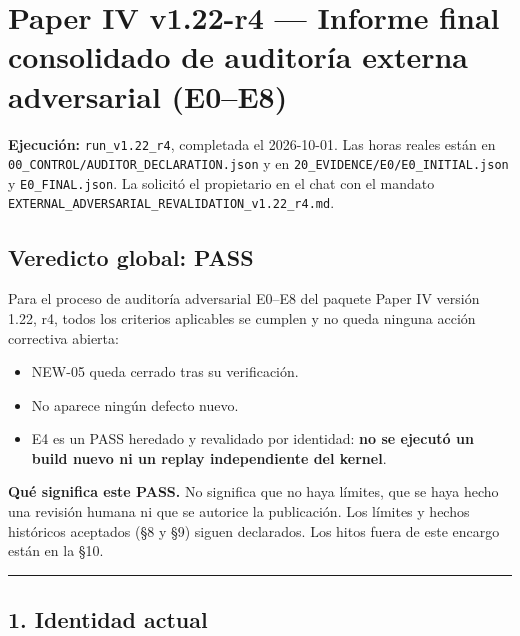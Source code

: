 \documentclass[
]{article}
\author{}
\date{}
\providecommand{\tightlist}{%
  \setlength{\itemsep}{0pt}\setlength{\parskip}{0pt}}
\begin{document}
\section{Paper IV v1.22-r4 --- Informe final consolidado de auditoría
externa adversarial
(E0--E8)}\label{paper-iv-v122-r4--informe-final-consolidado-de-auditoruxeda-externa-adversarial-e0e8}

\textbf{Ejecución:} \texttt{run\_v1.22\_r4}, completada el 2026-10-01.
Las horas reales están en \texttt{00\_CONTROL/AUDITOR\_DECLARATION.json}
y en \texttt{20\_EVIDENCE/E0/E0\_INITIAL.json} y
\texttt{E0\_FINAL.json}. La solicitó el propietario en el chat con el
mandato \texttt{EXTERNAL\_ADVERSARIAL\_REVALIDATION\_v1.22\_r4.md}.

\subsection{Veredicto global: PASS}\label{veredicto-global-pass}

Para el proceso de auditoría adversarial E0--E8 del paquete Paper IV
versión 1.22, r4, todos los criterios aplicables se cumplen y no queda
ninguna acción correctiva abierta:

\begin{itemize}
\tightlist
\item
  NEW-05 queda cerrado tras su verificación.
\item
  No aparece ningún defecto nuevo.
\item
  E4 es un PASS heredado y revalidado por identidad: \textbf{no se
  ejecutó un build nuevo ni un replay independiente del kernel}.
\end{itemize}

\textbf{Qué significa este PASS.} No significa que no haya límites, que
se haya hecho una revisión humana ni que se autorice la publicación. Los
límites y hechos históricos aceptados (§8 y §9) siguen declarados. Los
hitos fuera de este encargo están en la §10.

\begin{center}\rule{0.5\linewidth}{0.5pt}\end{center}

\subsection{1. Identidad actual}\label{1-identidad-actual}
\end{document}
